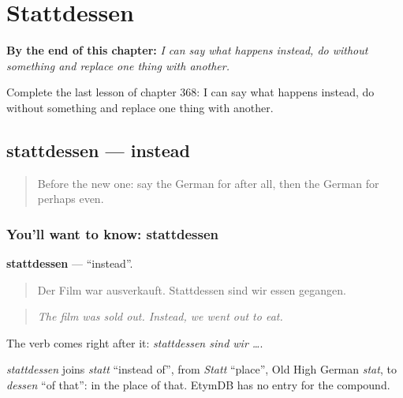 
\chapter{Stattdessen}
\label{ch:ge-stattdessen}

\begin{chapteropening}
\textbf{By the end of this chapter:} \emph{I can say what happens instead, do without something and replace one thing with another.}

Complete the last lesson of chapter 368: I can say what happens instead, do without something and replace one thing with another.
\end{chapteropening}

\section[stattdessen]{stattdessen — instead}

\label{lesson:GE-C368-stattdessen}



\begin{quote}
Before the new one: say the German for after all, then the German for perhaps even.
\end{quote}

\subsection*{You'll want to know: stattdessen}
\textbf{stattdessen} — \textquotedblleft{}instead\textquotedblright{}.

\begin{quote}
Der Film war ausverkauft. Stattdessen sind wir essen gegangen.
\end{quote}

\begin{quote}
\emph{The film was sold out. Instead, we went out to eat.}
\end{quote}

The verb comes right after it: \emph{stattdessen sind wir …}.

\begin{cousinweb}
\emph{stattdessen} joins \emph{statt} \textquotedblleft{}instead of\textquotedblright{}, from \emph{Statt} \textquotedblleft{}place\textquotedblright{}, Old High German \emph{stat}, to \emph{dessen} \textquotedblleft{}of that\textquotedblright{}: in the place of that. EtymDB has no entry for the compound.
\end{cousinweb}

